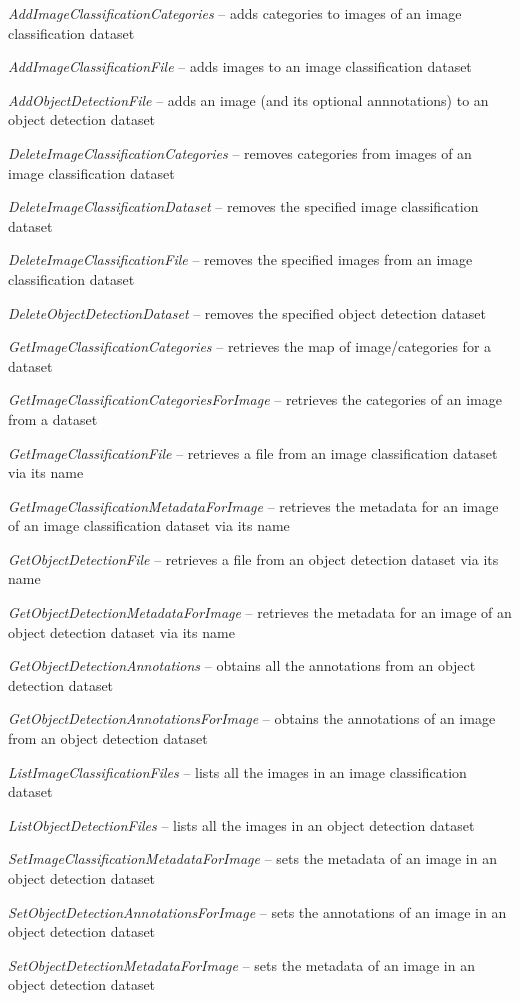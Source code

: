\documentclass[a4paper]{book}
\begin{document}
\begin{tight_itemize}
  \item \textit{AddImageClassificationCategories} -- adds categories to images of an image classification dataset
  \item \textit{AddImageClassificationFile} -- adds images to an image classification dataset
  \item \textit{AddObjectDetectionFile} -- adds an image (and its optional annnotations) to an object detection dataset
  \item \textit{DeleteImageClassificationCategories} -- removes categories from images of an image classification dataset
  \item \textit{DeleteImageClassificationDataset} -- removes the specified image classification dataset
  \item \textit{DeleteImageClassificationFile} -- removes the specified images from an image classification dataset
  \item \textit{DeleteObjectDetectionDataset} -- removes the specified object detection dataset
  \item \textit{GetImageClassificationCategories} -- retrieves the map of image/categories for a dataset
  \item \textit{GetImageClassificationCategoriesForImage} -- retrieves the categories of an image from a dataset
  \item \textit{GetImageClassificationFile} -- retrieves a file from an image classification dataset via its name
  \item \textit{GetImageClassificationMetadataForImage} -- retrieves the metadata for an image of an image classification dataset via its name
  \item \textit{GetObjectDetectionFile} -- retrieves a file from an object detection dataset via its name
  \item \textit{GetObjectDetectionMetadataForImage} -- retrieves the metadata for an image of an object detection dataset via its name
  \item \textit{GetObjectDetectionAnnotations} -- obtains all the annotations from an object detection dataset
  \item \textit{GetObjectDetectionAnnotationsForImage} -- obtains the annotations of an image from an object detection dataset
  \item \textit{ListImageClassificationFiles} -- lists all the images in an image classification dataset
  \item \textit{ListObjectDetectionFiles} -- lists all the images in an object detection dataset
  \item \textit{SetImageClassificationMetadataForImage} -- sets the metadata of an image in an object detection dataset
  \item \textit{SetObjectDetectionAnnotationsForImage} -- sets the annotations of an image in an object detection dataset
  \item \textit{SetObjectDetectionMetadataForImage} -- sets the metadata of an image in an object detection dataset
\end{tight_itemize}
\end{document}
